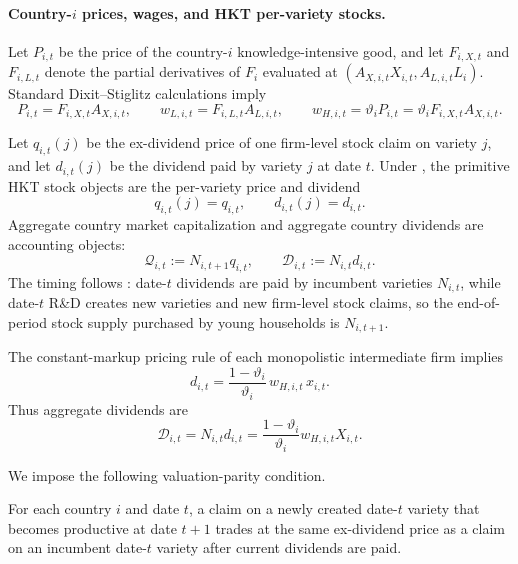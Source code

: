 \documentclass{article}
\begin{document}
\paragraph{Country-$i$ prices, wages, and HKT per-variety stocks.}
Let $P_{i,t}$ be the price of the country-$i$ knowledge-intensive good, and let $F_{i,X,t}$ and $F_{i,L,t}$ denote the partial derivatives of $F_i$ evaluated at $(A_{X,i,t}X_{i,t},A_{L,i,t}L_i)$. Standard Dixit--Stiglitz calculations imply
\begin{equation}\label{country_factor_prices}
P_{i,t}=F_{i,X,t}A_{X,i,t},
\qquad
w_{L,i,t}=F_{i,L,t}A_{L,i,t},
\qquad
w_{H,i,t}=\vartheta_i P_{i,t}=\vartheta_i F_{i,X,t}A_{X,i,t}.
\end{equation}

Let $q_{i,t}(j)$ be the ex-dividend price of one firm-level stock claim on variety $j$, and let $d_{i,t}(j)$ be the dividend paid by variety $j$ at date $t$. Under , the primitive HKT stock objects are the per-variety price and dividend
\[
q_{i,t}(j)=q_{i,t},
\qquad
d_{i,t}(j)=d_{i,t}.
\]
Aggregate country market capitalization and aggregate country dividends are accounting objects:
\begin{equation}\label{country_stock_aggregation}
\mathcal Q_{i,t}
:=
N_{i,t+1}q_{i,t},
\qquad
\mathcal D_{i,t}
:=
N_{i,t}d_{i,t}.
\end{equation}
The timing follows \citet{hirano2025technological}: date-$t$ dividends are paid by incumbent varieties $N_{i,t}$, while date-$t$ R\&D creates new varieties and new firm-level stock claims, so the end-of-period stock supply purchased by young households is $N_{i,t+1}$.

The constant-markup pricing rule of each monopolistic intermediate firm implies
\begin{equation}\label{country_variety_profit}
d_{i,t}
=
\frac{1-\vartheta_i}{\vartheta_i}\,w_{H,i,t}\,x_{i,t}.
\end{equation}
Thus aggregate dividends are
\begin{equation}\label{country_dividend_formula}
\mathcal D_{i,t}
=
N_{i,t}d_{i,t}
=
\frac{1-\vartheta_i}{\vartheta_i}w_{H,i,t}X_{i,t}.
\end{equation}

We impose the following valuation-parity condition.

\begin{ass}\label{ass_entry_valuation}
For each country $i$ and date $t$, a claim on a newly created date-$t$ variety that becomes productive at date $t+1$ trades at the same ex-dividend price as a claim on an incumbent date-$t$ variety after current dividends are paid.
\end{ass}
\end{document}
